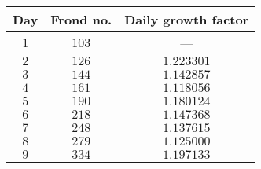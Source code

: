\begin{tabular}{ccc}                    \toprule
Day & Frond no. & Daily growth factor \\\midrule
$1$ & $103$     & ---        \\[4pt]
$2$ & $126$     & $1.223301$ \\[4pt]
$3$ & $144$     & $1.142857$ \\[4pt]
$4$ & $161$     & $1.118056$ \\[4pt]
$5$ & $190$     & $1.180124$ \\[4pt]
$6$ & $218$     & $1.147368$ \\[4pt]
$7$ & $248$     & $1.137615$ \\[4pt]
$8$ & $279$     & $1.125000$ \\[4pt]
$9$ & $334$     & $1.197133$ \\\bottomrule
\end{tabular}
